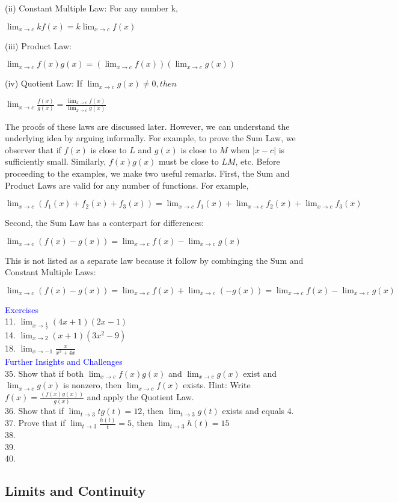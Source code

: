 \documentclass{article}
\begin{document}
(ii) Constant Multiple Law: For any number k,
\begin{center}$\lim_{x \to c}kf(x) = k\lim_{x \to c}f(x)$\end{center}

(iii) Product Law:
\begin{center}$\lim_{x \to c}f(x)g(x) = (\lim_{x \to c}f(x))(\lim_{x \to c}g(x))$\end{center}

(iv) Quotient Law: If $\lim_{x \to c}g(x) \neq 0, then$
\begin{center}$\lim_{x \to c}\frac{f(x)}{g(x)} = \frac{\lim_{x \to c}f(x)}{\lim_{x \to c}g(x)}$\end{center}

	The proofs of these laws are discussed later. However, we can understand the underlying idea by arguing informally. For example, to prove the Sum Law, we observer that if $f(x)$ is close to $L$ and $g(x)$ is close to $M$ when $\left|x - c\right|$ is sufficiently small. Similarly, $f(x)g(x)$ must be close to $LM$, etc.
	Before proceeding to the examples, we make two useful remarks. First, the Sum and Product Laws are valid for any number of functions. For example,
\begin{center}$\lim_{x \to c}(f_1(x) + f_2(x) + f_3(x)) = \lim_{x \to c}f_1(x) + \lim_{x \to c}f_2(x) + \lim_{x \to c}f_3(x)$\end{center}
	Second, the Sum Law has a conterpart for differences:
\begin{center}$\lim_{x \to c}(f(x) - g(x)) = \lim_{x \to c}f(x) - \lim_{x \to c}g(x) $\end{center}
	This is not listed as a separate law because it follow by combinging the Sum and Constant Multiple Laws:
\begin{center} $\lim_{x \to c}(f(x) - g(x)) = \lim_{x \to c}f(x) + \lim_{x \to c}(- g(x)) = \lim_{x \to c}f(x) - \lim_{x \to c}g(x)$\end{center}

\textcolor{blue}{Exercises}\\
11. $\lim_{x \to \frac{1}{2}}(4x + 1)(2x - 1)$\\
14. $\lim_{x \to 2}(x + 1)(3x^2 - 9)$\\
18. $\lim_{x \to -1}\frac{x}{x^3 + 4x}$\\

\textcolor{blue}{Further Insights and Challenges}\\
35. Show that if both $\lim_{x \to c}f(x)g(x)$ and $\lim_{x \to c}g(x)$ exist and $\lim_{x \to c}g(x)$ is nonzero, then $\lim_{x \to c}f(x)$ exists. Hint: Write $f(x) = \frac{(f(x)g(x))}{g(x)}$ and apply the Quotient Law.\\
36. Show that if $\lim_{t \to 3}tg(t) = 12$, then $\lim_{t \to 3}g(t)$ exists and equals 4.\\
37. Prove that if $\lim_{t \to 3}\frac{h(t)}{t} = 5$, then $\lim_{t \to 3}h(t) = 15$\\
38.\\
39.\\
40.\\

\subsection*{Limits and Continuity}
\end{document}
